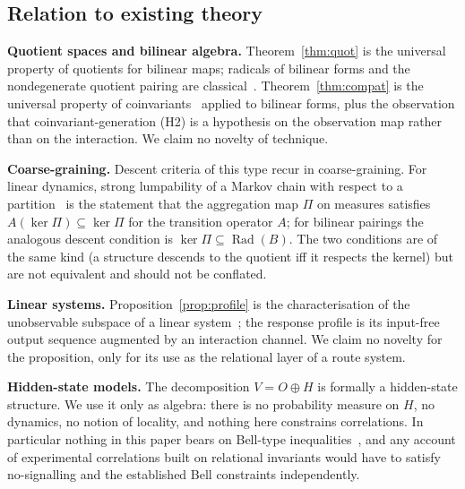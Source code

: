 \documentclass[11pt,a4paper]{article}
\newcommand{\Rad}{\operatorname{Rad}}
\theoremstyle{plain}
\theoremstyle{definition}
\begin{document}
\subsection{Relation to existing theory}
\textbf{Quotient spaces and bilinear algebra.} Theorem~\ref{thm:quot} is the universal property of quotients for bilinear maps; radicals of bilinear forms and the nondegenerate quotient pairing are classical~\cite{Lan02,Rom08,Gre75}. Theorem~\ref{thm:compat} is the universal property of coinvariants~\cite{Bro82} applied to bilinear forms, plus the observation that coinvariant-generation (H2) is a hypothesis on the observation map rather than on the interaction. We claim no novelty of technique.
\par\smallskip\noindent
\textbf{Coarse-graining.} Descent criteria of this type recur in coarse-graining. For linear dynamics, strong lumpability of a Markov chain with respect to a partition~\cite{KS60} is the statement that the aggregation map $\Pi$ on measures satisfies $A(\ker\Pi)\subseteq\ker\Pi$ for the transition operator $A$; for bilinear pairings the analogous descent condition is $\ker\Pi\subseteq\Rad(B)$. The two conditions are of the same kind (a structure descends to the quotient iff it respects the kernel) but are not equivalent and should not be conflated.
\par\smallskip\noindent
\textbf{Linear systems.} Proposition~\ref{prop:profile} is the characterisation of the unobservable subspace of a linear system~\cite{Kal60,Son98}; the response profile is its input-free output sequence augmented by an interaction channel. We claim no novelty for the proposition, only for its use as the relational layer of a route system.
\par\smallskip\noindent
\textbf{Hidden-state models.} The decomposition $V=O\oplus H$ is formally a hidden-state structure. We use it only as algebra: there is no probability measure on $H$, no dynamics, no notion of locality, and nothing here constrains correlations. In particular nothing in this paper bears on Bell-type inequalities~\cite{Bel64,CHSH69,Tsi80}, and any account of experimental correlations built on relational invariants would have to satisfy no-signalling and the established Bell constraints independently.
\end{document}
